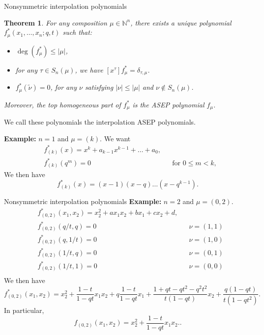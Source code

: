 \documentclass[10pt]{beamer}
\newcommand{\NN}{\mathbb N}
\newtheorem{thm}{Theorem}[section]
\theoremstyle{definition}
\theoremstyle{remark}
\begin{document}
\begin{frame}{Nonsymmetric interpolation polynomials}
\vspace{0.4cm}
    \begin{thm}
For any composition $\mu\in \NN^n$, there exists a unique polynomial $f^*_\mu(x_1,\dots,x_n;q,t)$ such that:
    \begin{itemize}
        \item $\deg(f^*_\mu)\leq |\mu|$,
        \item for any $\tau\in S_n(\mu)$, we have $[x^\tau]f^*_\mu=\delta_{\tau,\mu}$.
        \item $f^*_\mu(\widetilde \nu)=0$, for any $\nu$ satisfying $|\nu|\leq |\mu|$ and $\nu\notin S_n(\mu)$.
    \end{itemize}
Moreover, the top homogeneous part of $f^*_\mu$ is the ASEP polynomial $f_\mu$.      
\end{thm}
We call these polynomials the \textcolor{uibred}{interpolation ASEP polynomials}.

\pause

\textbf{Example:} $n=1$ and $\mu=(k)$.
We want
\begin{align*}
    &f^*_{(k)}(x)=x^k+a_{k-1}x^{k-1}+\dots+a_0,&&\\
    &f^*_{(k)}(q^m)=0 &&\text{for $0\leq m<k$},
\end{align*}
We then have $$f_{(k)}^{*}(x)=(x-1)(x-q)\dots (x-q^{k-1}).$$

\end{frame}


\begin{frame}{Nonsymmetric interpolation polynomials}
    \textbf{Example:} $n=2$ and $\mu=(0,2)$.
\begin{align*}
    &f^*_{(0,2)}(x_1,x_2)=x_2^2+a x_1x_2+bx_1+cx_2+d,&&\\
    &f^*_{(0,2)}(q/t,q)=0&&\nu=(1,1)\\
    &f^*_{(0,2)}(q,1/t)=0&&\nu=(1,0)\\
    &f^*_{(0,2)}(1/t,q)=0&&\nu=(0,1)\\
    &f^*_{(0,2)}(1/t,1)=0&&\nu=(0,0)\\
\end{align*}
We then have 
$$f_{(0,2)}^{*}(x_1,x_2)=x_2^2+\frac{1-t}{1-qt}x_1x_2 +  q\frac{1-t}{1-qt}x_1+\frac{1+qt-qt^2-q^2t^2}{t(1-qt)}x_2+ \frac{q(1-qt)}{t(1-qt^2)}
.$$
In particular,
$$f_{(0,2)}(x_1,x_2)=x_2^2+\frac{1-t}{1-qt}x_1x_2.
.$$



\end{frame}
\end{document}
